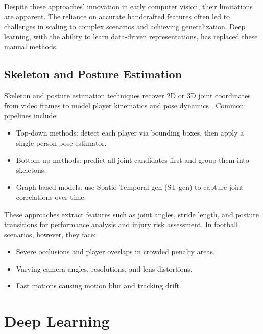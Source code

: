 Despite these approaches' innovation in early computer vision, their limitations are apparent. The reliance on accurate handcrafted features often led to challenges in scaling to complex scenarios and achieving generalization. Deep learning, with the ability to learn data-driven representations, has replaced these manual methods.

\subsection{Skeleton and Posture Estimation}
\label{ssec:skeleton_posture_estimation}

Skeleton and posture estimation techniques recover 2D or 3D joint coordinates from video frames to model player kinematics and pose dynamics \cite{elaoud_skeleton-based_2020, wang_skeleton_two-stream_2023, reilly__skeleton_just_pi_2023}. Common pipelines include:

\begin{itemize}
    \item Top-down methods: detect each player via bounding boxes, then apply a single-person pose estimator.
    \item Bottom-up methods: predict all joint candidates first and group them into skeletons.
    \item Graph-based models: use Spatio-Temporal \acrlong{gcn} (ST-\acrshort{gcn}) to capture joint correlations over time\cite{yan_spatial_temporal_graph_convolutional_2018}.
\end{itemize}

These approaches extract features such as joint angles, stride length, and posture transitions for performance analysis and injury risk assessment. In football scenarios, however, they face:

\begin{itemize}
    \item Severe occlusions and player overlaps in crowded penalty areas.
    \item Varying camera angles, resolutions, and lens distortions.
    \item Fast motions causing motion blur and tracking drift\cite{survey_of_survey}.
\end{itemize} 


\section{Deep Learning} 
\label{sec:deep_learning}

